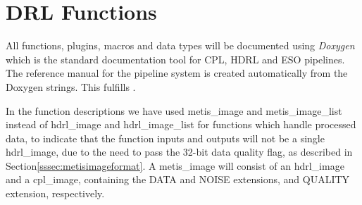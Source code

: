 \clearpage
\section{DRL Functions}\label{sec:drl_functions}


All functions, plugins, macros and data types will be documented using
\emph{Doxygen} which is the standard documentation tool for CPL, HDRL and ESO
pipelines. The reference manual for the pipeline system is created automatically
from the Doxygen strings. This fulfills .

In the function descriptions we have used metis\_image and
metis\_image\_list instead of hdrl\_image and hdrl\_image\_list for functions which handle
processed data, to
indicate that the function inputs and outputs will not be a single
hdrl\_image, due to the need to pass the 32-bit data quality flag, as
described in Section\ref{sssec:metisimageformat}.  A metis\_image will
consist of an hdrl\_image and a cpl\_image, containing the DATA and
NOISE extensions, and QUALITY extension, respectively.












